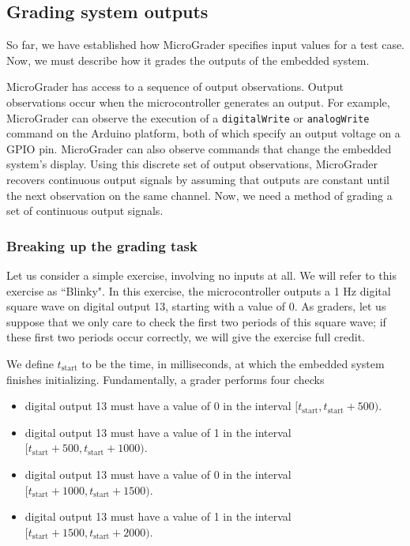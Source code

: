 \documentclass[12pt]{article}
\begin{document}
\subsection{Grading system outputs}
\label{sec:eval-point}
So far, we have established how MicroGrader specifies input values for a test case.  Now, we must describe how it grades the outputs of the embedded system.

MicroGrader has access to a sequence of output observations.  Output observations occur when the microcontroller generates an output.  For example, MicroGrader can observe the execution of a \texttt{digitalWrite} or \texttt{analogWrite} command on the Arduino platform, both of which specify an output voltage on a GPIO pin.  MicroGrader can also observe commands that change the embedded system's display.  Using this discrete set of output observations, MicroGrader recovers continuous output signals by assuming that outputs are constant until the next observation on the same channel.  Now, we need a method of grading a set of continuous output signals.


\subsubsection{Breaking up the grading task}
Let us consider a simple exercise, involving no inputs at all.  We will refer to this exercise as ``Blinky".  In this exercise, the microcontroller outputs a 1 Hz digital square wave on digital output 13, starting with a value of 0.  As graders, let us suppose that we only care to check the first two periods of this square wave; if these first two periods occur correctly, we will give the exercise full credit.

We define $t_{\text{start}}$ to be the time, in milliseconds, at which the embedded system finishes initializing.  Fundamentally, a grader performs four checks

\begin{itemize}
\item digital output 13 must have a value of 0 in the interval $[t_{\text{start}},t_{\text{start}}+500)$.
\item digital output 13 must have a value of 1 in the interval $[t_{\text{start}}+500,t_{\text{start}}+1000)$.
\item digital output 13 must have a value of 0 in the interval $[t_{\text{start}}+1000,t_{\text{start}}+1500)$.
\item digital output 13 must have a value of 1 in the interval $[t_{\text{start}}+1500,t_{\text{start}}+2000)$.
\end{itemize}
\end{document}
